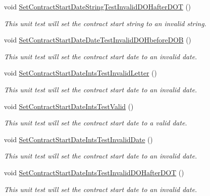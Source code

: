 \begin{DoxyCompactItemize}
void \hyperlink{class_my_all_employee_1_1_tests_1_1_contract_employee_tests_a891ba9b21cf8902876b83c54cc0c4851}{Set\+Contract\+Start\+Date\+String\+Test\+Invalid\+D\+O\+Hafter\+D\+O\+T} ()
\begin{DoxyCompactList}\small\item\em This unit test will set the contract start string to an invalid string. \end{DoxyCompactList}\item 
void \hyperlink{class_my_all_employee_1_1_tests_1_1_contract_employee_tests_ab2018211293ad52d299e8d253ade9536}{Set\+Contract\+Start\+Date\+Date\+Test\+Invalid\+D\+O\+Hbefore\+D\+O\+B} ()
\begin{DoxyCompactList}\small\item\em This unit test will set the contract start date to an invalid date. \end{DoxyCompactList}\item 
void \hyperlink{class_my_all_employee_1_1_tests_1_1_contract_employee_tests_a37a5d2abc21e0cc2eceacc10b82901ab}{Set\+Contract\+Start\+Date\+Ints\+Test\+Invalid\+Letter} ()
\begin{DoxyCompactList}\small\item\em This unit test will set the contract start date to an invalid date. \end{DoxyCompactList}\item 
void \hyperlink{class_my_all_employee_1_1_tests_1_1_contract_employee_tests_a3d5b0976b5a552242beaa1c36c24e000}{Set\+Contract\+Start\+Date\+Ints\+Test\+Valid} ()
\begin{DoxyCompactList}\small\item\em This unit test will set the contract start date to a valid date. \end{DoxyCompactList}\item 
void \hyperlink{class_my_all_employee_1_1_tests_1_1_contract_employee_tests_a1369f1d0638c30e10eaf7c47625c4120}{Set\+Contract\+Start\+Date\+Ints\+Test\+Invalid\+Date} ()
\begin{DoxyCompactList}\small\item\em This unit test will set the contract start date to an invalid date. \end{DoxyCompactList}\item 
void \hyperlink{class_my_all_employee_1_1_tests_1_1_contract_employee_tests_a9c422336c67090c4590edbd737ff4ab7}{Set\+Contract\+Start\+Date\+Ints\+Test\+Invalid\+D\+O\+Hafter\+D\+O\+T} ()
\begin{DoxyCompactList}\small\item\em This unit test will set the contract start date to an invalid date. \end{DoxyCompactList}\item 

\end{DoxyCompactItemize}
